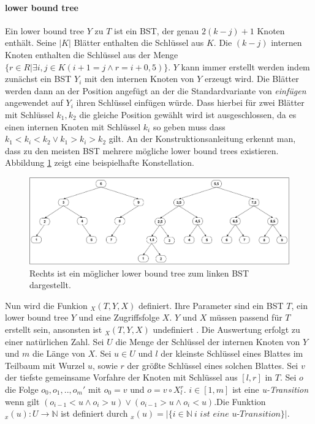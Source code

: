 \documentclass[a4paper,12pt]{article}
\begin{document}
\paragraph{lower bound tree}
Ein lower bound tree $Y$ zu $T$ ist ein BST, der genau $2 \left(k - j \right) + 1$ Knoten enthält. Seine $\vert K \vert$ Blätter enthalten die Schlüssel aus $K$. Die $\left(k - j \right)$ internen Knoten enthalten die Schlüssel aus der Menge $\{r \in R \vert \exists i,j \in K \left( i + 1 = j \land r = i + 0,5\right)\}$. $Y$ kann immer erstellt werden indem zunächst ein BST $Y_i$ mit den internen Knoten von $Y$ erzeugt wird. Die Blätter werden dann an der Position angefügt an der die Standardvariante von \textit{einfügen} angewendet auf $Y_i$ ihren Schlüssel einfügen würde. Dass hierbei für zwei Blätter mit Schlüssel $k_1, k_2$ die gleiche Position gewählt wird ist ausgeschlossen, da es einen internen Knoten mit Schlüssel $k_i$ so geben muss dass $k_1 < k_i < k_2 \lor k_1 > k_i > k_2 $ gilt. An der Konstruktionsanleitung erkennt man, dass zu den meisten BST mehrere mögliche lower bound trees existieren. Abbildung \ref{fig:lowerBoundTree} zeigt eine beispielhafte Konstellation. \\


        
\begin{figure}[h]
	\centering
	\includegraphics[width= 1\textwidth]{"Medien/DynOpt/lowerBoundTree"}
	\caption{Rechts ist ein möglicher lower bound tree zum linken BST dargestellt.  }
	\label{fig:lowerBoundTree}
\end{figure}

\noindent Nun wird die Funkion $_X(T, Y, X) $ definiert. Ihre Parameter sind ein BST $T$, ein lower bound tree $Y$ und eine Zugriffsfolge $X$. $Y$ und $X$ müssen passend für $T$ erstellt sein, ansonsten ist $_X(T, Y, X) $ undefiniert . Die Auswertung erfolgt zu einer natürlichen Zahl. Sei $U$ die Menge der Schlüssel der internen Knoten von $Y$ und $m$ die Länge von $X$. Sei $u \in U$ und $l$ der kleinste Schlüssel eines Blattes im Teilbaum mit Wurzel $u$, sowie $r$ der größte Schlüssel eines solchen Blattes. Sei $v$ der tiefste gemeinsame Vorfahre der Knoten mit Schlüssel aus $\left[l, r\right]$  in $T$. Sei $o$ die Folge $o_0, o_1,..,o_m'$ mit $o_0 = v$ und $o = v \circ X^r_l$. $i \in \left[1,m\right]$ ist eine \textit{u-Transition} wenn gilt $\left( o_{i-1} < u \land o_i > u \right) \lor \left( o_{i-1} > u \land o_i < u \right)$.Die Funktion $_x (u) \colon U \rightarrow \mathbb{N}$ ist definiert durch $_x(u) = \vert\{i \in \mathbb{N}\ \textit{i ist eine u-Transition}\} \vert$.
\end{document}
